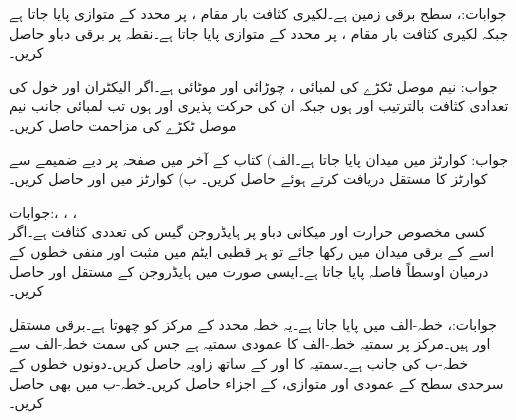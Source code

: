 جوابات:، 
سطح  برقی زمین ہے۔لکیری کثافت بار  مقام ،  پر  محدد کے متوازی پایا جاتا ہے جبکہ لکیری کثافت بار  مقام ،  پر  محدد کے متوازی پایا جاتا ہے۔نقطہ  پر برقی دباو حاصل کریں۔

جواب:
نیم موصل ٹکڑے کی لمبائی ، چوڑائی  اور موٹائی  ہے۔اگر الیکٹران اور خول کی تعدادی کثافت بالترتیب  اور  ہوں جبکہ ان کی حرکت پذیری  اور  ہوں تب لمبائی جانب نیم موصل ٹکڑے کی مزاحمت حاصل کریں۔

جواب:
 کوارٹز میں  میدان پایا جاتا ہے۔الف) کتاب کے آخر میں صفحہ  پر دیے ضمیمے سے  کوارٹز  کا مستقل  دریافت کرتے ہوئے   حاصل کریں۔ ب)  کوارٹز  میں  اور  حاصل کریں۔

جوابات:، ، ، \\ 
کسی مخصوص حرارت اور میکانی دباو پر ہایڈروجن  گیس کی تعددی کثافت  ہے۔اگر اسے  کے برقی میدان میں رکھا جائے تو ہر قطبی ایٹم  میں مثبت اور منفی خطوں کے درمیان اوسطاً  فاصلہ پایا جاتا ہے۔ایسی صورت میں ہایڈروجن کے مستقل  اور  حاصل کریں۔

جوابات:، 
خطہ-الف میں  پایا جاتا ہے۔یہ خطہ محدد کے مرکز کو چھوتا ہے۔برقی مستقل  اور  ہیں۔مرکز پر  سمتیہ  خطہ-الف کا عمودی سمتیہ ہے جس کی سمت خطہ-الف سے خطہ-ب کی جانب ہے۔سمتیہ  کا اور    کے ساتھ زاویہ حاصل کریں۔دونوں خطوں کے سرحدی سطح کے عمودی اور متوازی،  کے  اجزاء حاصل کریں۔خطہ-ب میں  بھی حاصل کریں۔

